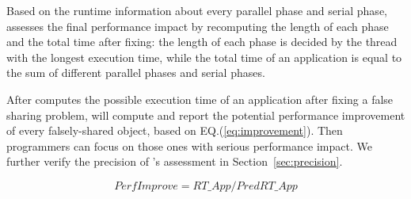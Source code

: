 Based on the runtime information about every parallel phase and serial phase, \cheetah{} assesses the final performance impact by recomputing the length of each phase and the total time after fixing: the length of each phase is decided by the thread with the longest execution time, while the total time of an application is equal to the sum of different parallel phases and serial phases. 

After \cheetah{} computes the possible execution time of an application after fixing a false sharing problem, \cheetah{} will compute and report the potential performance improvement of every falsely-shared object, based on EQ.(\ref{eq:improvement}). Then programmers can focus on those ones with serious performance impact. We further verify the precision of \cheetah{}'s assessment in Section~\ref{sec:precision}.

\begin{equation}
\label{eq:improvement}
PerfImprove = RT\_{App} / PredRT\_{App}
\end{equation}










